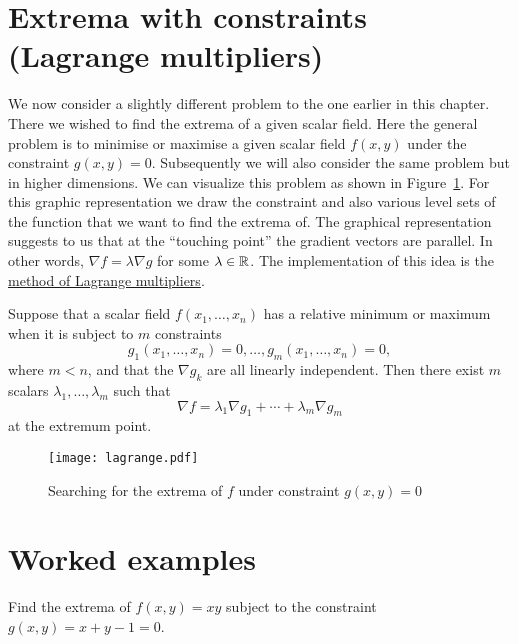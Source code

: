 \section{Extrema with constraints (Lagrange multipliers)}

We now consider a slightly different problem to the one earlier in this chapter.
There we wished to find the extrema of a given scalar field.
Here the general problem is to minimise or maximise a given scalar field \(f(x,y)\) under the constraint \(g(x,y) = 0\).
Subsequently we will also consider the same problem but in higher dimensions.
We can visualize this problem as shown in Figure~\ref{fig:lagrange}.
For this graphic representation we draw the constraint and also various level sets of the function that we want to find the extrema of.
The graphical representation suggests to us that at the ``touching point'' the gradient vectors are parallel.
In other words, \(\nabla f = \lambda \nabla g\) for some \(\lambda \in \mathbb{R}\).
The implementation of this idea is the \href{https://en.wikipedia.org/wiki/Lagrange_multiplier}{method of Lagrange multipliers}.


\begin{theorem}
    Suppose that a scalar field \(f(x_1,\ldots,x_n)\) has a relative minimum or maximum when it is subject to \(m\) constraints
    \[
        g_1(x_1,\ldots,x_n) = 0,
        \dots , g_m(x_1,\ldots,x_n)=0,
    \]
    where \(m<n\), and that the \(\nabla g_k\) are all linearly independent.
    Then there exist \(m\) scalars \(\lambda_1,\ldots,\lambda_m\) such that
    \[
        \nabla f = \lambda_1 \nabla g_1 + \cdots + \lambda_m \nabla g_m
    \]
    at the extremum point.
\end{theorem}

\begin{figure}[htb]
    \begin{center}
        \texttt{[image: lagrange.pdf]}
        \caption{Searching for the extrema of \(f\) under constraint \(g(x,y)=0\)}
        \label{fig:lagrange}
    \end{center}
\end{figure}




\section*{Worked examples}

\begin{task}
    Find the extrema of \(f(x,y) = xy\) subject to the constraint \(g(x,y) = x+y-1 =0\).
\end{task}

